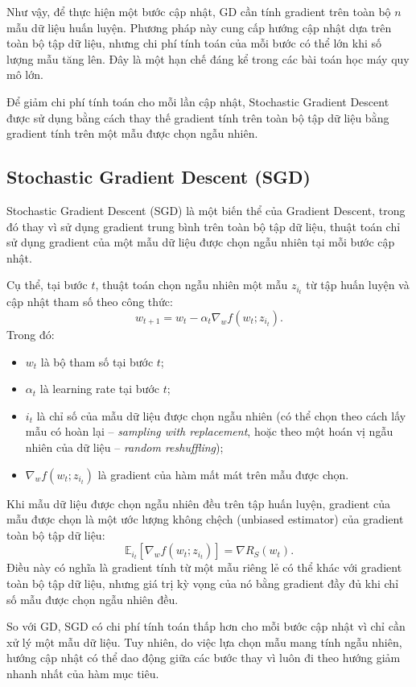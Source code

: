 Như vậy, để thực hiện một bước cập nhật, GD cần tính gradient trên toàn bộ $n$ mẫu dữ liệu huấn luyện. Phương pháp này cung cấp hướng cập nhật dựa trên toàn bộ tập dữ liệu, nhưng chi phí tính toán của mỗi bước có thể lớn khi số lượng mẫu tăng lên. Đây là một hạn chế đáng kể trong các bài toán học máy quy mô lớn.

Để giảm chi phí tính toán cho mỗi lần cập nhật, Stochastic Gradient Descent được sử dụng bằng cách thay thế gradient tính trên toàn bộ tập dữ liệu bằng gradient tính trên một mẫu được chọn ngẫu nhiên.

\subsection{Stochastic Gradient Descent (SGD)}

Stochastic Gradient Descent (SGD) là một biến thể của Gradient Descent, trong đó thay vì sử dụng gradient trung bình trên toàn bộ tập dữ liệu, thuật toán chỉ sử dụng gradient của một mẫu dữ liệu được chọn ngẫu nhiên tại mỗi bước cập nhật.

Cụ thể, tại bước $t$, thuật toán chọn ngẫu nhiên một mẫu $z_{i_t}$ từ tập huấn luyện và cập nhật tham số theo công thức:
\[
w_{t+1} = w_t - \alpha_t \nabla_w f(w_t; z_{i_t}).
\]
Trong đó:
\begin{itemize}
    \item $w_t$ là bộ tham số tại bước $t$;
    \item $\alpha_t$ là learning rate tại bước $t$;
    \item $i_t$ là chỉ số của mẫu dữ liệu được chọn ngẫu nhiên (có thể chọn theo cách lấy mẫu có hoàn lại -- \textit{sampling with replacement}, hoặc theo một hoán vị ngẫu nhiên của dữ liệu -- \textit{random reshuffling});
    \item $\nabla_w f(w_t; z_{i_t})$ là gradient của hàm mất mát trên mẫu được chọn.
\end{itemize}
Khi mẫu dữ liệu được chọn ngẫu nhiên đều trên tập huấn luyện, gradient của mẫu được chọn là một ước lượng không chệch (unbiased estimator) của gradient toàn bộ tập dữ liệu:
\[
\mathbb{E}_{i_t}\left[\nabla_w f(w_t; z_{i_t})\right] = \nabla R_S(w_t).
\]
Điều này có nghĩa là gradient tính từ một mẫu riêng lẻ có thể khác với gradient toàn bộ tập dữ liệu, nhưng giá trị kỳ vọng của nó bằng gradient đầy đủ khi chỉ số mẫu được chọn ngẫu nhiên đều.

So với GD, SGD có chi phí tính toán thấp hơn cho mỗi bước cập nhật vì chỉ cần xử lý một mẫu dữ liệu. Tuy nhiên, do việc lựa chọn mẫu mang tính ngẫu nhiên, hướng cập nhật có thể dao động giữa các bước thay vì luôn đi theo hướng giảm nhanh nhất của hàm mục tiêu.

